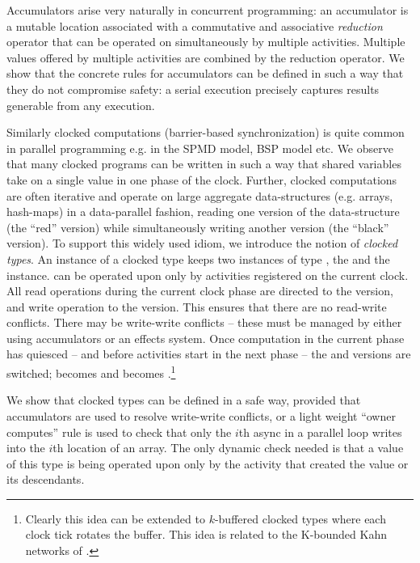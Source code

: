 Accumulators arise very naturally in concurrent programming: an
accumulator is a mutable location associated with a commutative and
associative {\em reduction} operator that can be operated on
simultaneously by multiple activities. Multiple values offered by
multiple activities are combined by the reduction operator. We show
that the concrete rules for accumulators can be defined in such a way
that they do not compromise safety: a serial execution precisely
captures results generable from any execution.

Similarly clocked computations (barrier-based synchronization) is
quite common in parallel programming e.g.{} in the SPMD model, BSP model
etc. We observe that many clocked programs can be written in such a
way that shared variables take on a single value in one phase of the
clock. Further, clocked computations are often iterative and operate
on large aggregate data-structures (e.g.{} arrays, hash-maps) in a
data-parallel fashion, reading one version of the data-structure (the
``red'' version) while simultaneously writing another version (the
 ``black'' version). To support this widely used idiom, we introduce
the notion of {\em clocked types}. An instance  of a  clocked type
 keeps two instances of type , the  and
the  instance.  can be operated upon only by
activities registered on the current clock.  All read operations
during the current clock phase are directed to the  version,
and write operation to the  version. This ensures that
there are no read-write conflicts. There may be write-write conflicts
-- these must be managed by either using accumulators or an effects
system. Once computation in the current phase has quiesced -- and
before activities start in the next phase -- the  and
 versions are switched;  becomes  and
 becomes .\footnote{Clearly this idea can be
  extended to $k$-buffered clocked types where each clock tick rotates
  the buffer. This idea is related to the K-bounded Kahn networks of
\cite{Cohen:2006:NSK:1111320.1111054}.}

We show that clocked types can be defined in a safe way, provided that
accumulators are used to resolve write-write conflicts, or a light
weight ``owner computes'' rule is used to check that only the $i$th async
in a parallel loop writes into the $i$th location of an array.
The only dynamic check needed is that a value of this type is being operated
upon only by the activity that created the value or its
descendants.

